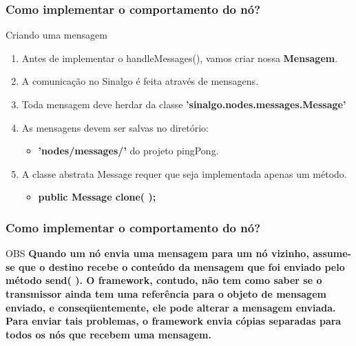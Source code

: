 \documentclass{beamer}
\begin{document}
\begin{frame}
\tiny
	
\end{frame}

\begin{frame}
	\frametitle{Como implementar o comportamento do nó?}
	
	\begin{block}{Criando uma mensagem}
	\small
		\begin{enumerate}
			\item Antes de implementar o handleMessages(), vamos criar nossa \textbf{Mensagem}.
			\item A comunicação no Sinalgo é feita através de mensagens.
			\item Toda mensagem deve herdar da classe \textbf{'sinalgo.nodes.messages.Message'}
			\item As mensagens devem ser salvas no diretório:
			\begin{itemize}
				\item \textbf{'nodes/messages/'} do projeto pingPong.
				
			\end{itemize}
			
			 \item A classe abstrata Message requer que seja 
implementada apenas um método.
			\begin{itemize}
				\item \textbf{public Message clone( );}
			\end{itemize}
		\end{enumerate}
		
	\end{block}	
	
	
\end{frame}
\begin{frame}
	\frametitle{Como implementar o comportamento do nó?}
	
	\begin{alertblock}{OBS}
		\textbf{
			Quando um nó envia uma mensagem para um nó vizinho, 
			assume-se que o destino recebe o conteúdo da mensagem que foi 
			enviado pelo método send( ). O framework, contudo, não tem 
			como saber se o transmissor ainda tem uma referência para o 
			objeto de mensagem enviado, e conseqüentemente, ele pode alterar 
			a mensagem enviada. Para enviar tais problemas, o framework 
			envia cópias separadas para todos os nós que recebem uma 
			mensagem.
		}
	\end{alertblock}
	
\end{frame}
\end{document}
